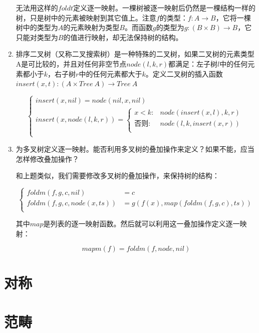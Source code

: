 \documentclass[UTF8]{article}
\begin{document}
\begin{enumerate}
无法用这样的$foldt$定义逐一映射。一棵树被逐一映射后仍然是一棵结构一样的树，只是树中的元素被映射到其它值上。注意$f$的类型：$f : A \to B$，它将一棵树中的类型为$A$的元素映射为类型$B$。而函数$g$的类型为$g : (B \times B) \to B$，它只能对类型为$B$的值进行映射，却无法保持树的结构。

\item 排序二叉树（又称二叉搜索树）是一种特殊的二叉树，如果二叉树的元素类型A是可比较的，并且对任何非空节点$node(l, k, r)$都满足：左子树$l$中的任何元素都小于$k$，右子树$r$中的任何元素都大于$k$。定义二叉树的插入函数$insert(x, t) : (A \times Tree\ A) \to Tree\ A$

\[ \begin{cases}
insert(x, nil) = node(nil, x, nil) \\
insert(x, node(l, k, r)) = \begin{cases}
  x < k: & node(insert(x, l), k, r) \\
  \text{否则}: & node(l, k, insert(x, r)) \\
\end{cases} \\
\end{cases}\]

\item 为多叉树定义逐一映射。能否利用多叉树的叠加操作来定义？如果不能，应当怎样修改叠加操作？

和上题类似，我们需要修改多叉树的叠加操作，来保持树的结构：

\[
\begin{cases}
foldm(f, g, c, nil) & = c \\
foldm(f, g, c, node(x, ts)) & = g(f(x), map(foldm(f, g, c), ts)) \\
\end{cases}
\]

其中$map$是列表的逐一映射函数。然后就可以利用这一叠加操作定义逐一映射：

\[
mapm(f) = foldm(f, node, nil)
\]

\end{enumerate}

\section{对称}
\shipoutAnswer

\section{范畴}
\end{document}
